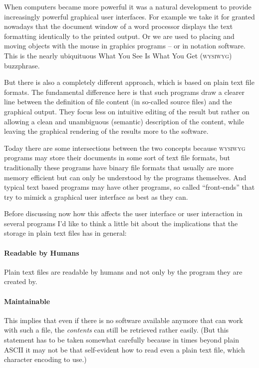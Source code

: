 \documentclass[../../LilyPond-Tutorials]{subfiles}
\begin{document}
When computers became more powerful it was a natural development to provide increasingly powerful graphical user interfaces.
For example we take it for granted nowadays that the document window of a word processor displays the text formatting identically to the printed output.
Or we are used to placing and moving objects with the mouse in graphics programs -- or in notation software.
This is the nearly ubiquituous What You See Is What You Get (\textsc{wysiwyg}) buzzphrase.

But there is also a completely different approach, which is based on plain text file formats.
The fundamental difference here is that such programs draw a clearer line between the definition of file content (in so-called source files) and the graphical output.
They focus less on intuitive editing of the result but rather on allowing a clean and unambiguous (semantic) description of the content, while leaving the graphical rendering of the results more to the software.

Today there are some intersections between the two concepts because \textsc{wysiwyg} programs may store their documents in some sort of text file formats, but traditionally these programs have binary file formats that usually are more memory efficient but can only be understood by the programs themselves.
And typical text based programs may have other programs, so called “front-ends” that try to mimick a graphical user interface as best as they can.

Before discussing now how this affects the user interface or user interaction in several programs I'd like to think a little bit about the implications that the storage in plain text files has in general:

\paragraph{Readable by Humans}
Plain text files are readable by humans and not only by the program they are created by.

\paragraph{Maintainable}
This implies that even if there is no software available anymore that can work with such a file, the \emph{contents} can still be retrieved rather easily.
(But this statement has to be taken somewhat carefully because in times beyond plain ASCII it may not be that self-evident how to read even a plain text file, which character encoding to use.)
\end{document}
